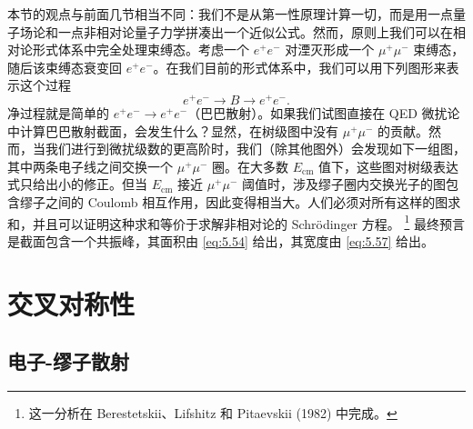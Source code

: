 本节的观点与前面几节相当不同：我们不是从第一性原理计算一切，而是用一点量子场论和一点非相对论量子力学拼凑出一个近似公式。然而，原则上我们可以在相对论形式体系中完全处理束缚态。考虑一个 $e^{+}e^{-}$ 对湮灭形成一个 $\mu^{+}\mu^{-}$ 束缚态，随后该束缚态衰变回 $e^{+}e^{-}$。在我们目前的形式体系中，我们可以用下列图形来表示这个过程
\begin{equation}
  e^{+}e^{-} \to B \to e^{+}e^{-} .
\end{equation}
净过程就是简单的 $e^{+}e^{-}\to e^{+}e^{-}$（巴巴散射）。如果我们试图直接在 QED 微扰论中计算巴巴散射截面，会发生什么？显然，在树级图中没有 $\mu^{+}\mu^{-}$ 的贡献。然而，当我们进行到微扰级数的更高阶时，我们（除其他图外）会发现如下一组图，其中两条电子线之间交换一个 $\mu^{+}\mu^{-}$ 圈。在大多数 $E_{\mathrm{cm}}$ 值下，这些图对树级表达式只给出小的修正。但当 $E_{\mathrm{cm}}$ 接近 $\mu^{+}\mu^{-}$ 阈值时，涉及缪子圈内交换光子的图包含缪子之间的 Coulomb 相互作用，因此变得相当大。人们必须对所有这样的图求和，并且可以证明这种求和等价于求解非相对论的 Schr\"odinger 方程。%
\footnote{这一分析在 Berestetskii、Lifshitz 和 Pitaevskii (1982) 中完成。} 最终预言是截面包含一个共振峰，其面积由 \eqref{eq:5.54} 给出，其宽度由 \eqref{eq:5.57} 给出。

\section{交叉对称性}

\subsection{电子-缪子散射}

